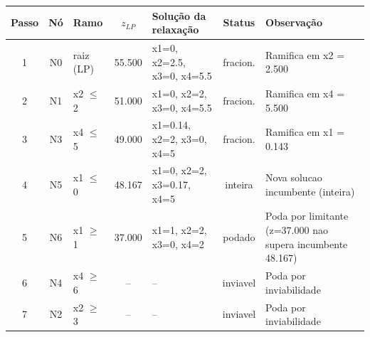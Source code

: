 \begin{footnotesize}
\begin{longtable}{c c l c l c p{4.2cm}}
\toprule
Passo & N\'o & Ramo & $z_{LP}$ & Solu\c{c}\~ao da relaxa\c{c}\~ao & Status & Observa\c{c}\~ao \\
\midrule
\endhead
1 & N0 & raiz (LP) & 55.500 & x1=0, x2=2.5, x3=0, x4=5.5 & fracion. & Ramifica em x2 = 2.500 \\
2 & N1 & x2 $\leq$ 2 & 51.000 & x1=0, x2=2, x3=0, x4=5.5 & fracion. & Ramifica em x4 = 5.500 \\
3 & N3 & x4 $\leq$ 5 & 49.000 & x1=0.14, x2=2, x3=0, x4=5 & fracion. & Ramifica em x1 = 0.143 \\
4 & N5 & x1 $\leq$ 0 & 48.167 & x1=0, x2=2, x3=0.17, x4=5 & inteira & Nova solucao incumbente (inteira) \\
5 & N6 & x1 $\geq$ 1 & 37.000 & x1=1, x2=2, x3=0, x4=2 & podado & Poda por limitante (z=37.000 nao supera incumbente 48.167) \\
6 & N4 & x4 $\geq$ 6 & -- & -- & inviavel & Poda por inviabilidade \\
7 & N2 & x2 $\geq$ 3 & -- & -- & inviavel & Poda por inviabilidade \\
\bottomrule
\end{longtable}
\end{footnotesize}
